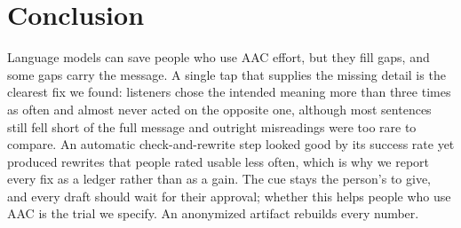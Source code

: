 \documentclass[letterpaper]{article} %
\begin{document}
\section{Conclusion}
Language models can save people who use AAC effort, but they fill gaps, and some gaps carry the message.
A single tap that supplies the missing detail is the clearest fix we found: listeners chose the intended meaning more than three times as often and almost never acted on the opposite one, although most sentences still fell short of the full message and outright misreadings were too rare to compare.
An automatic check-and-rewrite step looked good by its success rate yet produced rewrites that people rated usable less often, which is why we report every fix as a ledger rather than as a gain.
The cue stays the person's to give, and every draft should wait for their approval; whether this helps people who use AAC is the trial we specify.
An anonymized artifact rebuilds every number.


\end{document}
